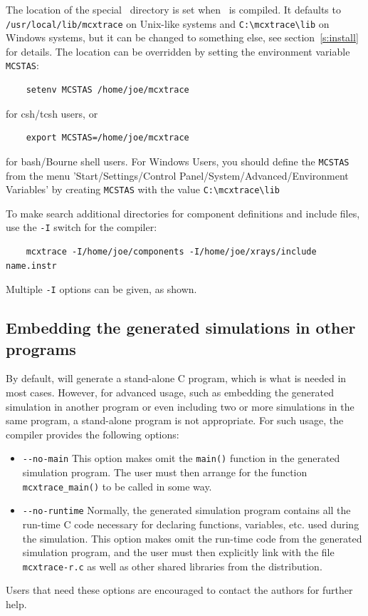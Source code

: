 The location of the special \MCX\ directory is set when \MCX\ is
compiled. It defaults to \verb+/usr/local/lib/mcxtrace+ on Unix-like systems and \verb+C:\mcxtrace\lib+ on Windows systems, but it can be
changed to something else, see section~\ref{s:install} for
details. The location can be overridden by setting the environment
variable \verb+MCSTAS+: 
\begin{verbatim}
    setenv MCSTAS /home/joe/mcxtrace
\end{verbatim}
for csh/tcsh users, or
\begin{verbatim}
    export MCSTAS=/home/joe/mcxtrace
\end{verbatim}
for bash/Bourne shell users.
For Windows Users, you should define the \verb+MCSTAS+ from the menu 'Start/Settings/Control Panel/System/Advanced/Environment
Variables' by creating \verb+MCSTAS+ with the value \verb+C:\mcxtrace\lib+

To make \MCX search additional directories for component definitions
and include files, use the \verb+-I+ switch for the \MCX compiler:
\begin{verbatim}
    mcxtrace -I/home/joe/components -I/home/joe/xrays/include name.instr
\end{verbatim}
Multiple \verb+-I+ options can be given, as shown.


\subsection{Embedding the generated simulations in other programs}

By default, \MCX will generate a stand-alone C program, which is what
is needed in most cases. However, for advanced usage, such as embedding
the generated simulation in another program or even including two or
more simulations in the same program, a stand-alone program is not
appropriate. For such usage, the \MCX compiler provides the following
options:
\begin{itemize}
\item \verb+--no-main+ This option makes \MCX omit the \verb+main()+
  function in the generated simulation program. The user must then
  arrange for the function \verb+mcxtrace_main()+ to be called in some
  way.
\item \verb+--no-runtime+ Normally, the
  generated simulation program contains all the run-time C code necessary for
  declaring functions, variables, etc. used during the simulation.  This
  option makes \MCX omit the run-time code from the generated
  simulation program, and the user must then explicitly link with the file
  \verb+mcxtrace-r.c+ as well as other shared libraries from the \MCX{} distribution.
\end{itemize}
Users that need these options are encouraged to contact the authors for
further help.


